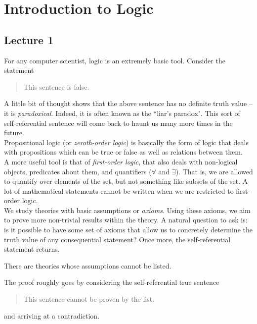 \section{Introduction to Logic}

\subsection{Lecture 1}

For any computer scientist, logic is an extremely basic tool. Consider the statement
\begin{quote}
	This sentence is false.
\end{quote}
A little bit of thought shows that the above sentence has no definite truth value -- it is \textit{paradoxical}. Indeed, it is often known as the ``liar's paradox". This sort of self-referential sentence will come back to haunt us many more times in the future.\\

Propositional logic (or \textit{zeroth-order logic}) is basically the form of logic that deals with propositions which can be true or false as well as relations between them.\\
A more useful tool is that of \textit{first-order logic}, that also deals with non-logical objects, predicates about them, and quantifiers ($\forall$ and $\exists$). That is, we are allowed to quantify over elements of the set, but not something like subsets of the set. A lot of mathematical statements cannot be written when we are restricted to first-order logic.\\

We study theories with basic assumptions or \textit{axioms}. Using these axioms, we aim to prove more non-trivial results within the theory. A natural question to ask is: is it possible to have some set of axioms that allow us to concretely determine the truth value of any consequential statement? Once more, the self-referential statement returns.

\begin{theorem}
There are theories whose assumptions cannot be listed.
\end{theorem}

The proof roughly goes by considering the self-referential true sentence
\begin{quote}
	This sentence cannot be proven by the list.
\end{quote}
and arriving at a contradiction.

